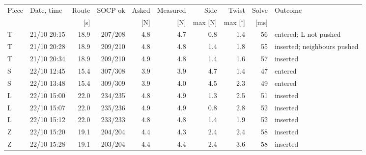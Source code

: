 \begin{tabular}{@{}llrrrrrrrl@{}}
\toprule
Piece & Date, time & Route & SOCP ok & Asked & Measured & Side & Twist & Solve & Outcome \\
 & & [s] & & [N] & [N] & max [N] & max [$^\circ$] & [ms] & \\
\midrule
T & 21/10 20:15 & 18.9 & 207/208 & 4.8 & 4.7 & 0.8 & 1.4 & 56 & entered; L not pushed \\
T & 21/10 20:28 & 18.9 & 209/210 & 4.8 & 4.8 & 1.4 & 1.8 & 55 & inserted; neighbours pushed \\
T & 21/10 20:34 & 18.9 & 209/210 & 4.9 & 4.8 & 1.4 & 1.6 & 57 & inserted \\
S & 22/10 12:45 & 15.4 & 307/308 & 3.9 & 3.9 & 4.7 & 1.4 & 47 & entered \\
S & 22/10 13:48 & 15.4 & 309/309 & 3.9 & 4.0 & 4.5 & 2.3 & 49 & entered \\
L & 22/10 15:00 & 22.0 & 234/235 & 4.8 & 4.9 & 1.3 & 2.5 & 51 & inserted \\
L & 22/10 15:07 & 22.0 & 235/236 & 4.9 & 4.9 & 0.8 & 2.8 & 52 & inserted \\
L & 22/10 15:12 & 22.0 & 233/233 & 4.8 & 4.8 & 1.4 & 1.9 & 52 & inserted \\
Z & 22/10 15:20 & 19.1 & 204/204 & 4.4 & 4.3 & 2.4 & 2.4 & 58 & inserted \\
Z & 22/10 15:28 & 19.1 & 203/204 & 4.4 & 4.4 & 2.4 & 3.6 & 58 & inserted \\
\bottomrule
\end{tabular}
